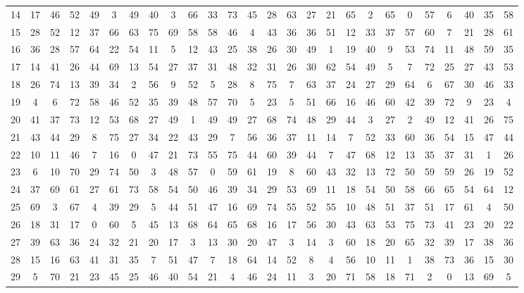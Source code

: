 \begin{table}
\begin{tabular}{c c c c c c c c c c c c c c c c c c c c c c c c c c }
14 & 17 & 46 & 52 & 49 & 3 & 49 & 40 & 3 & 66 & 33 & 73 & 45 & 28 & 63 & 27 & 21 & 65 & 2 & 65 & 0 & 57 & 6 & 40 & 35 & 58 \\
15 & 28 & 52 & 12 & 37 & 66 & 63 & 75 & 69 & 58 & 58 & 46 & 4 & 43 & 36 & 36 & 51 & 12 & 33 & 37 & 57 & 60 & 7 & 21 & 28 & 61 \\
16 & 36 & 28 & 57 & 64 & 22 & 54 & 11 & 5 & 12 & 43 & 25 & 38 & 26 & 30 & 49 & 1 & 19 & 40 & 9 & 53 & 74 & 11 & 48 & 59 & 35 \\
17 & 14 & 41 & 26 & 44 & 69 & 13 & 54 & 27 & 37 & 31 & 48 & 32 & 31 & 26 & 30 & 62 & 54 & 49 & 5 & 7 & 72 & 25 & 27 & 43 & 53 \\
18 & 26 & 74 & 13 & 39 & 34 & 2 & 56 & 9 & 52 & 5 & 28 & 8 & 75 & 7 & 63 & 37 & 24 & 27 & 29 & 64 & 6 & 67 & 30 & 46 & 33 \\
19 & 4 & 6 & 72 & 58 & 46 & 52 & 35 & 39 & 48 & 57 & 70 & 5 & 23 & 5 & 51 & 66 & 16 & 46 & 60 & 42 & 39 & 72 & 9 & 23 & 4 \\
20 & 41 & 37 & 73 & 12 & 53 & 68 & 27 & 49 & 1 & 49 & 49 & 27 & 68 & 74 & 48 & 29 & 44 & 3 & 27 & 2 & 49 & 12 & 41 & 26 & 75 \\
21 & 43 & 44 & 29 & 8 & 75 & 27 & 34 & 22 & 43 & 29 & 7 & 56 & 36 & 37 & 11 & 14 & 7 & 52 & 33 & 60 & 36 & 54 & 15 & 47 & 44 \\
22 & 10 & 11 & 46 & 7 & 16 & 0 & 47 & 21 & 73 & 55 & 75 & 44 & 60 & 39 & 44 & 7 & 47 & 68 & 12 & 13 & 35 & 37 & 31 & 1 & 26 \\
23 & 6 & 10 & 70 & 29 & 74 & 50 & 3 & 48 & 57 & 0 & 59 & 61 & 19 & 8 & 60 & 43 & 32 & 13 & 72 & 50 & 59 & 59 & 26 & 19 & 52 \\
24 & 37 & 69 & 61 & 27 & 61 & 73 & 58 & 54 & 50 & 46 & 39 & 34 & 29 & 53 & 69 & 11 & 18 & 54 & 50 & 58 & 66 & 65 & 54 & 64 & 12 \\
25 & 69 & 3 & 67 & 4 & 39 & 29 & 5 & 44 & 51 & 47 & 16 & 69 & 74 & 55 & 52 & 55 & 10 & 48 & 51 & 37 & 51 & 17 & 61 & 4 & 50 \\
26 & 18 & 31 & 17 & 0 & 60 & 5 & 45 & 13 & 68 & 64 & 65 & 68 & 16 & 17 & 56 & 30 & 43 & 63 & 53 & 75 & 73 & 41 & 23 & 20 & 22 \\
27 & 39 & 63 & 36 & 24 & 32 & 21 & 20 & 17 & 3 & 13 & 30 & 20 & 47 & 3 & 14 & 3 & 60 & 18 & 20 & 65 & 32 & 39 & 17 & 38 & 36 \\
28 & 15 & 16 & 63 & 41 & 31 & 35 & 7 & 51 & 47 & 7 & 18 & 64 & 14 & 52 & 8 & 4 & 56 & 10 & 11 & 1 & 38 & 73 & 36 & 15 & 30 \\
29 & 5 & 70 & 21 & 23 & 45 & 25 & 46 & 40 & 54 & 21 & 4 & 46 & 24 & 11 & 3 & 20 & 71 & 58 & 18 & 71 & 2 & 0 & 13 & 69 & 5 \\

\end{tabular}
\end{table}
